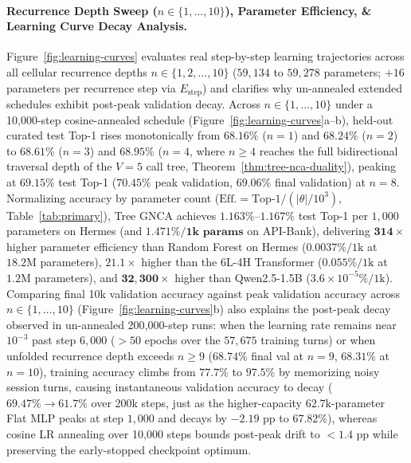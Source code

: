 \documentclass[10pt,twocolumn,letterpaper]{article}
\begin{document}
\paragraph{Recurrence Depth Sweep ($n \in \{1, \dots, 10\}$), Parameter Efficiency, \& Learning Curve Decay Analysis.}
Figure~\ref{fig:learning-curves} evaluates real step-by-step learning trajectories across all cellular recurrence depths $n \in \{1, 2, \dots, 10\}$ ($59{,}134$ to $59{,}278$ parameters; $+16$ parameters per recurrence step via $E_{\text{step}}$) and clarifies why un-annealed extended schedules exhibit post-peak validation decay. Across $n \in \{1, \dots, 10\}$ under a 10{,}000-step cosine-annealed schedule (Figure~\ref{fig:learning-curves}a--b), held-out curated test Top-1 rises monotonically from $68.16\%$ ($n=1$) and $68.24\%$ ($n=2$) to $68.61\%$ ($n=3$) and $\mathbf{68.95\%}$ ($n=4$, where $n \ge 4$ reaches the full bidirectional traversal depth of the $V=5$ call tree, Theorem~\ref{thm:tree-nca-duality}), peaking at $\mathbf{69.15\%}$ test Top-1 ($70.45\%$ peak validation, $69.06\%$ final validation) at $n=8$. Normalizing accuracy by parameter count ($\text{Eff.} = \text{Top-1} / (|\theta|/10^3)$, Table~\ref{tab:primary}), Tree GNCA achieves $\mathbf{1.163\%}$--$\mathbf{1.167\%}$ test Top-1 per $1{,}000$ parameters on Hermes (and $\mathbf{1.471\% / \text{1k params}}$ on API-Bank), delivering $\mathbf{314\times}$ higher parameter efficiency than Random Forest on Hermes ($0.0037\% / \text{1k}$ at $18.2\text{M}$ parameters), $\mathbf{21.1\times}$ higher than the 6L-4H Transformer ($0.055\% / \text{1k}$ at $1.2\text{M}$ parameters), and $\mathbf{32{,}300\times}$ higher than Qwen2.5-1.5B ($3.6 \times 10^{-5}\% / \text{1k}$). Comparing final 10k validation accuracy against peak validation accuracy across $n \in \{1, \dots, 10\}$ (Figure~\ref{fig:learning-curves}b) also explains the post-peak decay observed in un-annealed 200{,}000-step runs: when the learning rate remains near $10^{-3}$ past step $6{,}000$ ($>50$ epochs over the $57{,}675$ training turns) or when unfolded recurrence depth exceeds $n \ge 9$ ($68.74\%$ final val at $n=9$, $68.31\%$ at $n=10$), training accuracy climbs from $77.7\%$ to $97.5\%$ by memorizing noisy session turns, causing instantaneous validation accuracy to decay ($69.47\% \to 61.7\%$ over 200k steps, just as the higher-capacity $62.7\text{k}$-parameter Flat MLP peaks at step $1{,}000$ and decays by $-2.19\text{ pp}$ to $67.82\%$), whereas cosine LR annealing over 10{,}000 steps bounds post-peak drift to $<1.4\text{ pp}$ while preserving the early-stopped checkpoint optimum.
\end{document}
